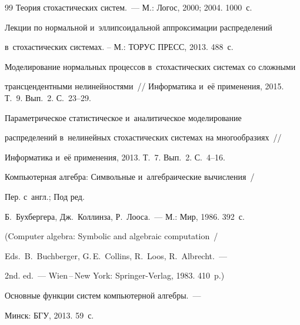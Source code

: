 {{\begin{thebibliography}{99}
Теория стохастических систем.~--- М.: Логос, 2000; 2004. 1000~с.







Лекции по нормальной и~эллипсоидальной аппроксимации распределений 

в~стохастических системах. -- М.: ТОРУС ПРЕСС, 2013. 488~с.







Моделирование нормальных процессов в~стохастических системах со сложными 

трансцендентными нелинейностями~/\!\!/ Информатика и~её применения, 2015. Т.~9. Вып.~2. С.~23--29.





Параметрическое статистическое и~аналитическое моделирование 

распределений в~нелинейных стохастических системах на многообразиях~/\!\!/ 

Информатика и~её применения, 2013. Т.~7. Вып.~2. С.~4--16.




Компьютерная алгебра: Символьные и~алгебраические вычисления~/ 

 Пер. с~англ.; Под ред. 

Б.~Бухбергера, Дж.~Коллинза, Р.~Лооса.~--- М.: Мир, 1986. 392~с.

(Computer algebra: Symbolic and algebraic computation~/

Eds.\ B.~Buchberger, G.\,E.~Collins, R.~Loos, R.~Albrecht.~--- 

 2nd. ed.~--- Wien\,--\,New York: Springer-Verlag, 1983. 410~p.)






 Основные функции систем компьютерной алгебры.~--- 

Минск: БГУ, 2013. 59~с.





\end{thebibliography}}}
